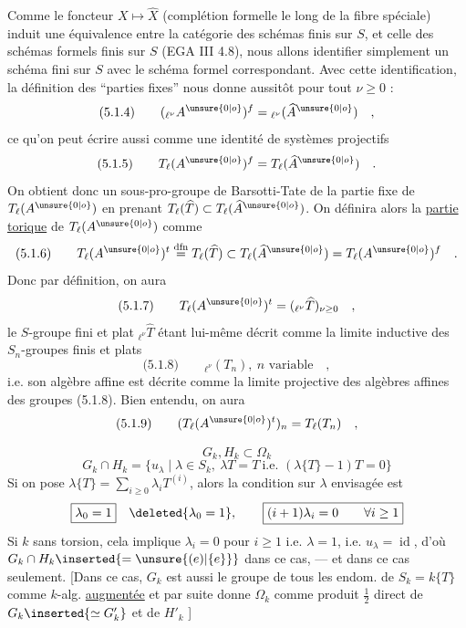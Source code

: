 Comme le foncteur $X\longmapsto\widehat X$ (complétion formelle le long de la fibre spéciale) induit une équivalence entre la catégorie des schémas finis sur $S$, et celle des schémas formels finis sur $S$ (EGA III 4.8), nous allons identifier simplement un schéma fini sur $S$ avec le schéma formel correspondant. Avec cette identification, la définition des ``parties fixes'' nous donne aussitôt pour tout $\nu\geq0$ :
\[
\text{(5.1.4)}\qquad ({}_{\ell^\nu}A^{\unsure{0|o}})^f={}_{\ell^\nu}(\widehat A^{\unsure{0|o}})\quad ,
\]
ce qu'on peut écrire aussi comme une identité de systèmes projectifs
\[
\text{(5.1.5)}\qquad T_\ell(A^{\unsure{0|o}})^f=T_\ell(\widehat A^{\unsure{0|o}})\quad .
\]
On obtient donc un sous-pro-groupe de Barsotti-Tate de la partie fixe de $T_\ell(A^{\unsure{0|o}})$ en prenant $T_\ell(\widehat T)\subset T_\ell(\widehat A^{\unsure{0|o}})$. On définira alors la \uline{partie torique} de $T_\ell(A^{\unsure{0|o}})$ comme
\[
\text{(5.1.6)}\qquad T_\ell(A^{\unsure{0|o}})^t\overset{\mathrm{dfn}}=T_\ell(\widehat T)\subset T_\ell(\widehat A^{\unsure{0|o}})=T_\ell(A^{\unsure{0|o}})^f\quad .
\]
Donc par définition, on aura
\[
\text{(5.1.7)}\qquad T_\ell(A^{\unsure{0|o}})^t=({}_{\ell^\nu}\widehat T)_{\nu\geq0}\quad ,
\]
le $S$-groupe fini et plat ${}_{\ell^\nu}\widehat T$ étant lui-même décrit comme la limite inductive des $S_n$-groupes finis et plats
\[
\text{(5.1.8)}\qquad {}_{\ell^\nu}(T_n),\ n\text{ variable}\quad ,
\]
i.e. son algèbre affine est décrite comme la limite projective des algèbres affines des groupes (5.1.8). Bien entendu, on aura
\[
\text{(5.1.9)}\qquad (T_\ell(A^{\unsure{0|o}})^t)_n=T_\ell(T_n)\quad ,
\]

\[
G_k,H_k\subset\Omega_k
\]
\[
G_k\cap H_k=\{u_\lambda\mid\lambda\in S_k,\ \lambda T=T\ \text{i.e. }(\lambda\{T\}-1)T=0\}
\]
Si on pose $\lambda\{T\}=\sum_{i\geq0}\lambda_i T^{(i)}$, alors la condition sur $\lambda$ envisagée est
\[
\boxed{\lambda_0=1}\quad\deleted{\lambda_0=1},\qquad\boxed{(i+1)\lambda_i=0\qquad\forall i\geq1}
\]
Si $k$ sans torsion, cela implique $\lambda_i=0$ pour $i\geq1$ i.e. $\lambda=1$, i.e. $u_\lambda=\operatorname{id}$, d'où $G_k\cap H_k\inserted{=\unsure{(e)|\{e\}}}$ dans ce cas, --- et dans ce cas seulement.
[Dans ce cas,  $G_k$ est aussi le groupe  de tous les endom. de $S_k=k\{T\}$ comme $k$-alg. \uline{augmentée}  et par suite 
donne $\Omega_k$ comme produit $\frac12$ direct de $G_k\inserted{\simeq G'_k}$ et de $H'_k$\unsure{\ldots} ]

